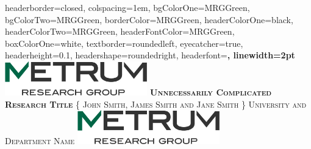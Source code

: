 \documentclass[landscape,a0paper,fontscale=0.5]{baposter} %
\begin{document}
\begin{poster}
{
headerborder=closed, %
colspacing=1em, %
bgColorOne=MRGGreen, %
bgColorTwo=MRGGreen, %
borderColor=MRGGreen, %
headerColorOne=black, %
headerColorTwo=MRGGreen, %
headerFontColor=MRGGreen, %
boxColorOne=white, %
textborder=roundedleft, %
eyecatcher=true, %
headerheight=0.1\textheight, %
headershape=roundedright, %
headerfont=\Large\bf\textsc, %
linewidth=2pt %
}
%
{\includegraphics[height=4em]{graphics/logo.jpg}} %
{\bf\textsc{Unnecessarily Complicated Research Title}\vspace{0.5em}} %
{\textsc{\{ John Smith, James Smith and Jane Smith \} \hspace{12pt} University and Department Name}} %
{\includegraphics[height=4em]{graphics/logo.jpg}} %



\end{poster}
\end{document}
